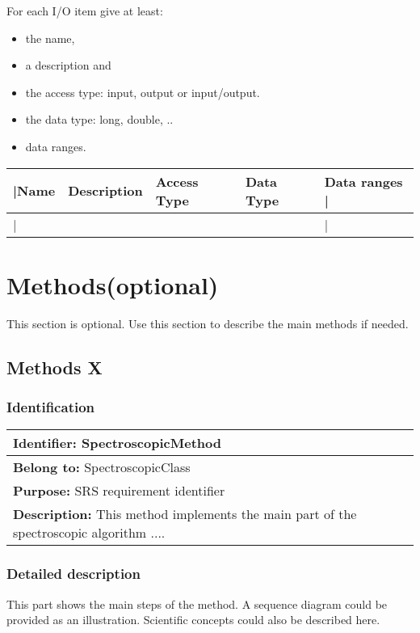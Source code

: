 \documentclass[SDCCH,esgsdraft,SDD]{esgsdoc}
\begin{document}
      For each I/O item give at least:

      \begin{itemize}
         \item the name,
         \item a description and
         \item the access type: input, output or input/output.
         \item the data type: long, double, ..
         \item data ranges.
      \end{itemize}

\begin{longtable}{|p{}|p{}|p{}|p{}|p{}|}\hline
|Name & Description & Access Type & Data Type & Data ranges | \\\hline
|{}&{}&{}&{}&{}|\\\hline
\end{longtable} \normalsize


\section{Methods(optional)}
This section is optional.
Use this section to describe the main methods if needed.

\subsection{Methods X}

\subsubsection{Identification}
\begin{longtable}{|p{}|}\hline
{\bf Identifier:} SpectroscopicMethod \\\hline
{\bf Belong to:} SpectroscopicClass \\\hline
{\bf Purpose:} SRS requirement identifier\\\hline
{\bf Description:} This method implements the main part of the spectroscopic algorithm ....\\\hline
\end{longtable} \normalsize

\subsubsection{Detailed description}
This part shows the main steps of the method. A sequence diagram could be provided as an illustration. Scientific concepts could also be described here.
\end{document}
